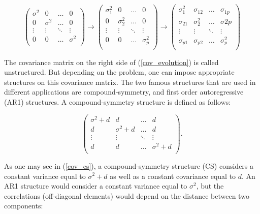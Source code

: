 \documentclass[11pt,a5paper,twoside]{book}
\begin{document}
\begin{equation}
\label{cov_evolution}
\left(
\begin{array}{cccc}
\sigma^2 & 0 & \ldots & 0 \\
0 & \sigma^2 & \ldots & 0  \\
\vdots & \vdots & \ddots & \vdots \\
0 & 0 & \ldots & \sigma^2 \\
\end{array} \right)\rightarrow \left(
\begin{array}{cccc}
\sigma_1^2 & 0 & \ldots & 0 \\
0 & \sigma_2^2 & \ldots & 0  \\
\vdots & \vdots & \ddots & \vdots \\
0 & 0 & \ldots & \sigma_p^2 \\
\end{array} \right)\rightarrow \left(
\begin{array}{cccc}
\sigma_1^2 & \sigma_{12} & \ldots & \sigma_{1p} \\
\sigma_{21} & \sigma_2^2 & \ldots & \sigma{2p}  \\
\vdots & \vdots & \ddots & \vdots \\
\sigma_{p1}& \sigma_{p2} & \ldots & \sigma_p^2 \\
\end{array} \right)
\end{equation}

The covariance matrix on the right side of (\ref{cov_evolution}) is called unstructured. But depending on the problem, one can impose appropriate structures on this covariance matrix. The two famous structures that are used in different applications are compound-symmetry, and first order autoregressive (AR1) structures. A compound-symmetry structure is defined as follows:

\begin{equation}
\label{cov_cs}
\left(
\begin{array}{cccc}
\sigma^2 + d & d & \ldots & d \\
d & \sigma^2 + d & \ldots & d  \\
\vdots & \vdots & \ddots & \vdots \\
d & d & \ldots & \sigma^2 + d \\
\end{array} \right).
\end{equation}

As one may see in (\ref{cov_cs}), a compound-symmetry structure (CS) considers a constant variance equal to $\sigma^2 + d$ as well as a constant covariance equal to $d$. An AR1 structure would consider a constant variance equal to $\sigma^2$, but the correlations (off-diagonal elements) would depend on the distance between two components:
\end{document}

